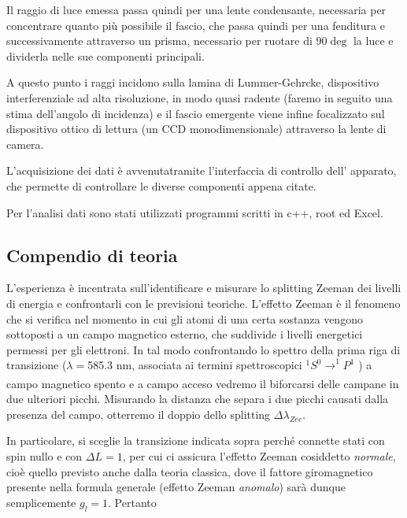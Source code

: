 \documentclass{article}
\begin{document}
	Il raggio di luce emessa passa quindi per una lente condensante, necessaria 
	per concentrare quanto più possibile il fascio, che passa quindi per una 
	fenditura e successivamente attraverso un prisma, necessario per ruotare di 
	$90\deg$ la luce e dividerla nelle sue componenti principali. 
	
	A questo punto i raggi incidono sulla lamina di Lummer-Gehrcke, dispositivo
	interferenziale ad alta risoluzione, in modo quasi
	radente (faremo in seguito una stima dell'angolo di incidenza) e il fascio 
	emergente viene infine focalizzato sul dispositivo ottico di lettura (un CCD
	monodimensionale) attraverso la lente di camera.
	
	
	L'acquisizione dei dati è avvenutatramite l'interfaccia di controllo dell'
	apparato, che permette di controllare le diverse componenti appena citate.
	
	Per l'analisi dati sono stati utilizzati programmi scritti in c++, root ed Excel.
	
	\subsection*{Compendio di teoria}
	
	L'esperienza è incentrata sull'identificare e misurare lo splitting 
	Zeeman dei livelli di energia e confrontarli con le previsioni teoriche.
	L'effetto Zeeman è il fenomeno che si verifica nel momento in cui gli
	atomi di una certa sostanza vengono sottoposti a un campo magnetico 
	esterno, che suddivide i livelli energetici permessi per gli elettroni.
	In tal modo confrontando lo spettro della prima riga di transizione 
	($\lambda = $585.3 nm, associata ai termini spettroscopici
	$^1S^0 \xrightarrow[]{}  ^1P^1$ ) a campo magnetico spento e a campo 
	acceso vedremo 
	il biforcarsi delle campane in due ulteriori picchi. Misurando la
	distanza che separa i due picchi causati dalla presenza del campo,
	otterremo il doppio dello splitting $\Delta\lambda_{Zee} $.
	
	In particolare, si sceglie la transizione indicata sopra perché connette
	stati con spin nullo e con $\Delta L = 1$, per cui ci assicura l'effetto
	Zeeman cosiddetto \textit{normale}, cioè quello previsto anche dalla 
	teoria classica, dove il fattore giromagnetico presente nella formula 
	generale (effetto Zeeman \textit{anomalo}) sarà dunque semplicemente
	$g_l = 1$. Pertanto
	
\end{document}
